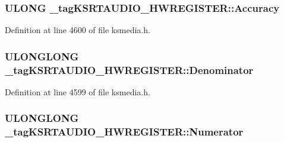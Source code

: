 \subsubsection[{\texorpdfstring{Accuracy}{Accuracy}}]{\setlength{\rightskip}{0pt plus 5cm}U\+L\+O\+NG \+\_\+tag\+K\+S\+R\+T\+A\+U\+D\+I\+O\+\_\+\+H\+W\+R\+E\+G\+I\+S\+T\+E\+R\+::\+Accuracy}\hypertarget{struct__tag_k_s_r_t_a_u_d_i_o___h_w_r_e_g_i_s_t_e_r_a30aa2b744c744bb00f94bc7de2867937}{}\label{struct__tag_k_s_r_t_a_u_d_i_o___h_w_r_e_g_i_s_t_e_r_a30aa2b744c744bb00f94bc7de2867937}


Definition at line 4600 of file ksmedia.\+h.

\subsubsection[{\texorpdfstring{Denominator}{Denominator}}]{\setlength{\rightskip}{0pt plus 5cm}U\+L\+O\+N\+G\+L\+O\+NG \+\_\+tag\+K\+S\+R\+T\+A\+U\+D\+I\+O\+\_\+\+H\+W\+R\+E\+G\+I\+S\+T\+E\+R\+::\+Denominator}\hypertarget{struct__tag_k_s_r_t_a_u_d_i_o___h_w_r_e_g_i_s_t_e_r_ad5e16088b37f44824b86350f71f1da85}{}\label{struct__tag_k_s_r_t_a_u_d_i_o___h_w_r_e_g_i_s_t_e_r_ad5e16088b37f44824b86350f71f1da85}


Definition at line 4599 of file ksmedia.\+h.

\subsubsection[{\texorpdfstring{Numerator}{Numerator}}]{\setlength{\rightskip}{0pt plus 5cm}U\+L\+O\+N\+G\+L\+O\+NG \+\_\+tag\+K\+S\+R\+T\+A\+U\+D\+I\+O\+\_\+\+H\+W\+R\+E\+G\+I\+S\+T\+E\+R\+::\+Numerator}\hypertarget{struct__tag_k_s_r_t_a_u_d_i_o___h_w_r_e_g_i_s_t_e_r_a36d6a57f957b5efc35bc255ae5c1310c}{}\label{struct__tag_k_s_r_t_a_u_d_i_o___h_w_r_e_g_i_s_t_e_r_a36d6a57f957b5efc35bc255ae5c1310c}


